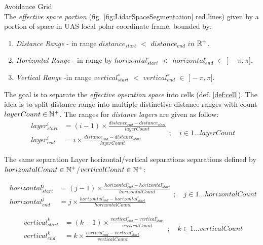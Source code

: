\begin{definition}{Avoidance Grid}\label{def:AvoidanceGrid} \\The \emph{effective space portion} (fig. \ref{fig:LidarSpaceSegmentation} red lines) given by a portion of space in UAS local polar coordinate frame, bounded by:
    \begin{enumerate}
        \item \emph{Distance Range} -  in range $distance_{start}$ $<$ $distance_{end}$ $in$ $\mathbb{R}^+$.
        \item \emph{Horizontal Range} - in range by $horizontal^\circ_{start}$ $<$ $horizontal^\circ_{end}$ $\in$ $]-\pi,\pi]$.
        \item \emph{Vertical Range} -in range $vertical^\circ_{start}$ $<$ $vertical^\circ_{end}$ $\in$ $]-\pi,\pi]$.
    \end{enumerate}

\noindent The goal is to separate the \emph{effective operation space} into cells (def. \ref{def:cell}). The idea is to split distance range into multiple distinctive distance ranges with count $layerCount \in \mathbb{N}^+$.  The ranges for \emph{distance layers} are given as follow:
\begin{equation}\label{eq:avoidanceGridCellDistanceRange}
    \begin{aligned}
        layer^i_{start} & = (i-1)\times\frac{distance_{end}-distance_{start}}{layer Count}\\
        layer^i_{end} & = i\times\frac{distance_{end}-distance_{start}}{layer Count}
    \end{aligned};\quad i\in 1\dots layer Count
\end{equation}

\noindent The same separation Layer horizontal/vertical separations separations defined by $horizontal Count \in \mathbb{N}^+$/$vertical Count \in \mathbb{N}^+$:

\begin{equation}\label{eq:avoidanceGridCellHorizontalRange}
    \begin{aligned}
        horizontal^j_{start} & = (j-1)\times\frac{horizontal^\circ_{end}-horizontal^\circ_{start}}{horizontal Count}\\
        horizontal^j_{end} & = j\times\frac{horizontal^\circ_{end}-horizontal^\circ_{start}}{horizontal Count}
    \end{aligned};\quad j\in 1\dots horizontal Count
\end{equation}


\begin{equation}\label{eq:avoidanceGridCellVerticalRange}
    \begin{aligned}
        vertical^k_{start} & = (k-1)\times\frac{vertical^\circ_{end}-vertical^\circ_{start}}{vertical Count}\\
        vertical^k_{end} & = k\times\frac{vertical^\circ_{end}-vertical^\circ_{start}}{vertical Count}
    \end{aligned};\quad k\in 1\dots vertical Count
\end{equation}



\end{definition}
